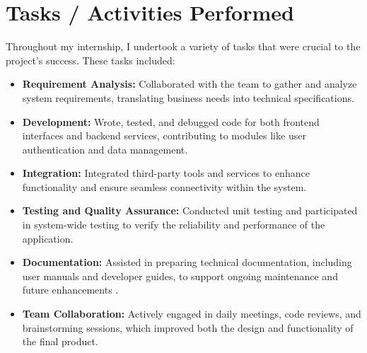 \section{Tasks / Activities Performed}
Throughout my internship, I undertook a variety of tasks that were crucial to the project's success. These tasks included:
\begin{itemize}
    \item \textbf{Requirement Analysis:} Collaborated with the team to gather and analyze system requirements, translating business needs into technical specifications.
    \item \textbf{Development:} Wrote, tested, and debugged code for both frontend interfaces and backend services, contributing to modules like user authentication and data management.
    \item \textbf{Integration:} Integrated third-party tools and services to enhance functionality and ensure seamless connectivity within the system.
    \item \textbf{Testing and Quality Assurance:} Conducted unit testing and participated in system-wide testing to verify the reliability and performance of the application.
    \item \textbf{Documentation:} Assisted in preparing technical documentation, including user manuals and developer guides, to support ongoing maintenance and future enhancements \cite{apaciteguide}.
    \item \textbf{Team Collaboration:} Actively engaged in daily meetings, code reviews, and brainstorming sessions, which improved both the design and functionality of the final product.
\end{itemize}
